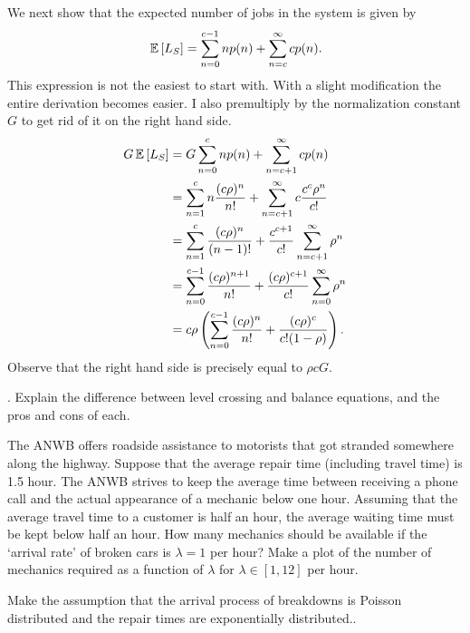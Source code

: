 \begin{question}
\begin{solution}
We next show that the expected number of jobs in the system is given
by
    \begin{equation*}
      \,\mathbb{E}\left[L_S\right] = \sum_{n=0}^{c-1} n p(n) + \sum_{n=c}^{\infty} c p(n).
    \end{equation*}
    This expression is not the easiest to start with. With a slight
    modification the entire derivation becomes easier. I also premultiply by the normalization constant $G$ to get rid of it on the right hand side. 
    \begin{equation*}
      \begin{split}
      G \,\mathbb{E}\left[L_S\right]
&= G \sum_{n=0}^{c} n p(n) + \sum_{n=c+1}^{\infty} c p(n) \\
&= \sum_{n=1}^{c} n \frac{(c\rho)^n}{n!}  + \sum_{n=c+1}^{\infty} c \frac{c^c\rho^n}{c!} \\
&= \sum_{n=1}^{c} \frac{(c\rho)^n}{(n-1)!}  + \frac{c^{c+1}}{c!}\sum_{n=c+1}^{\infty} \rho^n\\
&= \sum_{n=0}^{c-1} \frac{(c\rho)^{n+1}}{n!}  + \frac{(c\rho)^{c+1}}{c!}\sum_{n=0}^{\infty} \rho^n\\
&= c\rho \left(\sum_{n=0}^{c-1} \frac{(c\rho)^n}{n!}  + \frac{(c\rho)^{c}}{c!(1-\rho)}\right).
      \end{split}
    \end{equation*}
Observe that the right hand side is precisely equal to $\rho c G$. 

  \end{solution}
\end{question}



\begin{question}[use=false]
  \TBD.  Explain the difference between level crossing and balance
  equations, and the pros and cons of each.
\end{question}

\begin{question}[use=false]
  The ANWB offers roadside assistance to motorists that got stranded
  somewhere along the highway. Suppose that the average repair time
  (including travel time) is 1.5 hour. The ANWB strives to keep the
  average time between receiving a phone call and the actual
  appearance of a mechanic below one hour. Assuming that the average
  travel time to a customer is half an hour, the average waiting time
  must be kept below half an hour. How many mechanics should be
  available if the `arrival rate' of broken cars is $\lambda = 1$ per
  hour? Make a plot of the number of mechanics required as a function
  of $\lambda$ for $\lambda \in [1, 12]$ per hour. 

  Make the assumption that the arrival process of breakdowns is
  Poisson distributed and the repair times are exponentially distributed..
  \begin{solution}
    \TBD
  \end{solution}
\end{question}

